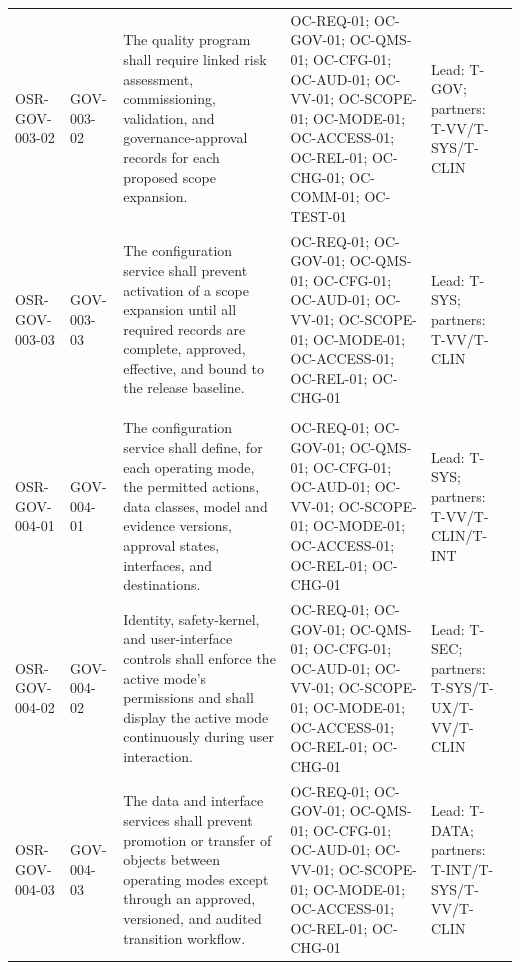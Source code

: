 \documentclass[11pt,letterpaper]{article}
\begin{document}
\begin{scriptsize}
\begin{longtable}{@{}L{0.16\textwidth}L{0.10\textwidth}L{0.31\textwidth}L{0.23\textwidth}L{0.125\textwidth}@{}}
\addlinespace[2pt]
\mbox{OSR-GOV-003-02} & \mbox{GOV-003-02} & The quality program shall require linked risk assessment, commissioning, validation, and governance-approval records for each proposed scope expansion. & OC-REQ-01; OC-GOV-01; OC-QMS-01; OC-CFG-01; OC-AUD-01; OC-VV-01; OC-SCOPE-01; OC-MODE-01; OC-ACCESS-01; OC-REL-01; OC-CHG-01; OC-COMM-01; OC-TEST-01 & Lead: T-GOV; partners: T-VV\slash\allowbreak{}T-SYS\slash\allowbreak{}T-CLIN \\
\addlinespace[2pt]
\mbox{OSR-GOV-003-03} & \mbox{GOV-003-03} & The configuration service shall prevent activation of a scope expansion until all required records are complete, approved, effective, and bound to the release baseline. & OC-REQ-01; OC-GOV-01; OC-QMS-01; OC-CFG-01; OC-AUD-01; OC-VV-01; OC-SCOPE-01; OC-MODE-01; OC-ACCESS-01; OC-REL-01; OC-CHG-01 & Lead: T-SYS; partners: T-VV\slash\allowbreak{}T-CLIN \\
\addlinespace[2pt]
 \\
\mbox{OSR-GOV-004-01} & \mbox{GOV-004-01} & The configuration service shall define, for each operating mode, the permitted actions, data classes, model and evidence versions, approval states, interfaces, and destinations. & OC-REQ-01; OC-GOV-01; OC-QMS-01; OC-CFG-01; OC-AUD-01; OC-VV-01; OC-SCOPE-01; OC-MODE-01; OC-ACCESS-01; OC-REL-01; OC-CHG-01 & Lead: T-SYS; partners: T-VV\slash\allowbreak{}T-CLIN\slash\allowbreak{}T-INT \\
\addlinespace[2pt]
\mbox{OSR-GOV-004-02} & \mbox{GOV-004-02} & Identity, safety-kernel, and user-interface controls shall enforce the active mode's permissions and shall display the active mode continuously during user interaction. & OC-REQ-01; OC-GOV-01; OC-QMS-01; OC-CFG-01; OC-AUD-01; OC-VV-01; OC-SCOPE-01; OC-MODE-01; OC-ACCESS-01; OC-REL-01; OC-CHG-01 & Lead: T-SEC; partners: T-SYS\slash\allowbreak{}T-UX\slash\allowbreak{}T-VV\slash\allowbreak{}T-CLIN \\
\addlinespace[2pt]
\mbox{OSR-GOV-004-03} & \mbox{GOV-004-03} & The data and interface services shall prevent promotion or transfer of objects between operating modes except through an approved, versioned, and audited transition workflow. & OC-REQ-01; OC-GOV-01; OC-QMS-01; OC-CFG-01; OC-AUD-01; OC-VV-01; OC-SCOPE-01; OC-MODE-01; OC-ACCESS-01; OC-REL-01; OC-CHG-01 & Lead: T-DATA; partners: T-INT\slash\allowbreak{}T-SYS\slash\allowbreak{}T-VV\slash\allowbreak{}T-CLIN \\

\end{longtable}
\end{scriptsize}
\end{document}
